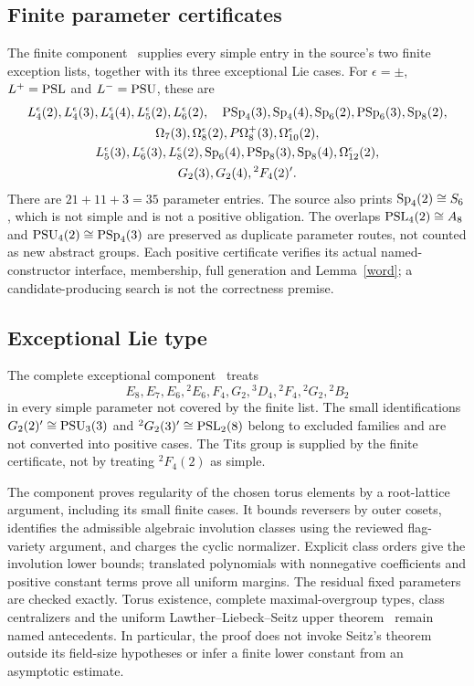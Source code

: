 \documentclass[11pt,a4paper]{article}
\begin{document}
\subsection{Finite parameter certificates}
The finite component~\cite{Finite} supplies every simple entry in the
source's two finite exception lists, together with its three exceptional
Lie cases. For $\epsilon=\pm$, $L^+=\operatorname{PSL}$ and $L^-=\operatorname{PSU}$, these are
\[
\begin{gathered}
 L_4^\epsilon(2),L_4^\epsilon(3),L_4^\epsilon(4),
 L_5^\epsilon(2),L_6^\epsilon(2),\quad
 \operatorname{PSp}_4(3),\operatorname{Sp}_4(4),\operatorname{Sp}_6(2),\operatorname{PSp}_6(3),\operatorname{Sp}_8(2),\\
 \Omega_7(3),\Omega_8^\epsilon(2),P\Omega_8^+(3),\Omega_{10}^\epsilon(2),\\
 L_5^\epsilon(3),L_6^\epsilon(3),L_8^\epsilon(2),
 \operatorname{Sp}_6(4),\operatorname{PSp}_8(3),\operatorname{Sp}_8(4),\Omega_{12}^\epsilon(2),\\
 G_2(3),G_2(4),{}^2F_4(2)'.
\end{gathered}
\]
There are $21+11+3=35$ parameter entries. The source also prints
$\operatorname{Sp}_4(2)\cong S_6$, which is not simple and is not a positive obligation.
The overlaps $\operatorname{PSL}_4(2)\cong A_8$ and
$\operatorname{PSU}_4(2)\cong\operatorname{PSp}_4(3)$ are preserved as duplicate parameter routes,
not counted as new abstract groups. Each positive certificate verifies
its actual named-constructor interface, membership, full generation and
Lemma~\ref{word}; a candidate-producing search is not the correctness
premise.

\subsection{Exceptional Lie type}
The complete exceptional component~\cite{Exceptional} treats
\[
 E_8,E_7,E_6,{}^2E_6,F_4,G_2,{}^3D_4,{}^2F_4,{}^2G_2,{}^2B_2
\]
in every simple parameter not covered by the finite list. The small
identifications $G_2(2)'\cong\operatorname{PSU}_3(3)$ and
${}^2G_2(3)'\cong\operatorname{PSL}_2(8)$ belong to excluded families and are not
converted into positive cases. The Tits group is supplied by the finite
certificate, not by treating ${}^2F_4(2)$ as simple.

The component proves regularity of the chosen torus elements by a
root-lattice argument, including its small finite cases. It bounds
reversers by outer cosets, identifies the admissible algebraic
involution classes using the reviewed flag-variety argument, and charges
the cyclic normalizer. Explicit class orders give the involution lower
bounds; translated polynomials with nonnegative coefficients and positive
constant terms prove all uniform margins. The residual fixed parameters
are checked exactly. Torus existence, complete maximal-overgroup types,
class centralizers and the uniform Lawther--Liebeck--Seitz upper theorem~\cite{LLS}
remain named antecedents. In particular, the proof does not invoke
Seitz's theorem outside its field-size hypotheses or infer a finite
lower constant from an asymptotic estimate.
\end{document}
